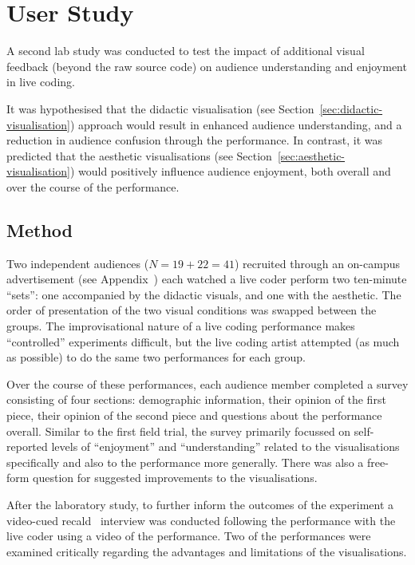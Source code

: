 
\chapter{User Study}
\label{chap:user-study}

A second lab study was conducted to test the impact of additional visual feedback (beyond the raw source code) on audience understanding and enjoyment in live coding.

It was hypothesised that the didactic visualisation (see Section~\ref{sec:didactic-visualisation}) approach would result in enhanced audience understanding, and a reduction in audience confusion through the performance. In contrast, it was predicted that the aesthetic visualisations (see Section~\ref{sec:aesthetic-visualisation}) would positively influence audience enjoyment, both overall and over the course of the performance. 

\section{Method}

Two independent audiences ($N=19+22=41$) recruited through an on-campus advertisement (see Appendix~) each watched a live coder perform two ten-minute ``sets'': one accompanied by the didactic visuals, and one with the aesthetic. The order of presentation of the two visual conditions was swapped between the groups. The improvisational nature of a live coding performance makes ``controlled'' experiments difficult, but the live coding artist attempted (as much as possible) to do the same two performances for each group.

Over the course of these performances, each audience member completed a survey consisting of four sections: demographic information, their opinion of the first piece, their opinion of the second piece and questions about the performance overall. Similar to the first field trial, the survey primarily focussed on self-reported levels of ``enjoyment'' and ``understanding'' related to the visualisations specifically and also to the performance more generally. There was also a free-form question for suggested improvements to the visualisations.

After the laboratory study, to further inform the outcomes of the experiment a video-cued recald~\cite{Suchman1992} interview was conducted following the performance with the live coder using a video of the performance. Two of the performances were examined critically regarding the advantages and limitations of the visualisations.

